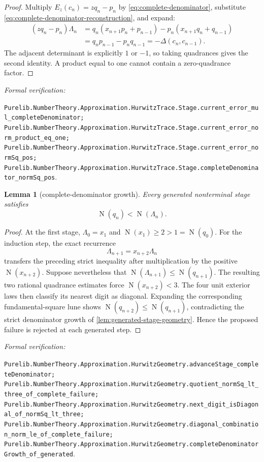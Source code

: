 \documentclass[11pt]{article}
\newtheorem{lemma}[lemma]{Lemma}
\newcommand{\Norm}[1]{\operatorname{N}\!\left(#1\right)}
\newcommand{\leanref}[1]{\par\smallskip\noindent
  \emph{Formal verification:}\par\nobreak
  {\raggedright\nolinkurl{#1}.\par}}
\begin{document}
\begin{proof}
Multiply $E_z(c_n)=zq_n-p_n$ by \eqref{eq:complete-denominator}, substitute
\eqref{eq:complete-denominator-reconstruction}, and expand:
\begin{align*}
 (zq_n-p_n)\Lambda_n
   &=q_n(x_{n+1}p_n+p_{n-1})
       -p_n(x_{n+1}q_n+q_{n-1})\\
   &=q_np_{n-1}-p_nq_{n-1}
    =-\Delta(c_n,c_{n-1}).
\end{align*}
The adjacent determinant is explicitly $1$ or $-1$, so taking quadrances
gives the second identity.  A product equal to one cannot contain a
zero-quadrance factor.
\end{proof}

\leanref{Purelib.NumberTheory.Approximation.HurwitzTrace.Stage.current_error_mul_completeDenominator;
Purelib.NumberTheory.Approximation.HurwitzTrace.Stage.current_error_norm_product_eq_one;
Purelib.NumberTheory.Approximation.HurwitzTrace.Stage.current_error_normSq_pos;
Purelib.NumberTheory.Approximation.HurwitzTrace.Stage.completeDenominator_normSq_pos}

\begin{lemma}[complete-denominator growth]
\label{lem:complete-denominator-growth}
Every generated nonterminal stage satisfies
\begin{equation}
\label{eq:complete-denominator-growth}
                         \Norm{q_n}<\Norm{\Lambda_n}.
\end{equation}
\end{lemma}

\begin{proof}
At the first stage, $\Lambda_0=x_1$ and
$\Norm{x_1}\ge2>1=\Norm{q_0}$.  For the induction step, the exact recurrence
\[
                  \Lambda_{n+1}=x_{n+2}\Lambda_n
\]
transfers the preceding strict inequality after multiplication by the
positive $\Norm{x_{n+2}}$.  Suppose nevertheless that
$\Norm{\Lambda_{n+1}}\le\Norm{q_{n+1}}$.  The resulting two rational
quadrance estimates force $\Norm{x_{n+2}}<3$.  The four unit exterior laws
then classify its nearest digit as diagonal.  Expanding the corresponding
fundamental-square lune shows
$\Norm{q_{n+2}}\le\Norm{q_{n+1}}$, contradicting the strict denominator
growth of \cref{lem:generated-stage-geometry}.  Hence the proposed failure is
rejected at each generated step.
\end{proof}

\leanref{Purelib.NumberTheory.Approximation.HurwitzGeometry.advanceStage_completeDenominator;
Purelib.NumberTheory.Approximation.HurwitzGeometry.quotient_normSq_lt_three_of_complete_failure;
Purelib.NumberTheory.Approximation.HurwitzGeometry.next_digit_isDiagonal_of_normSq_lt_three;
Purelib.NumberTheory.Approximation.HurwitzGeometry.diagonal_combination_norm_le_of_complete_failure;
Purelib.NumberTheory.Approximation.HurwitzGeometry.completeDenominatorGrowth_of_generated}
\end{document}
